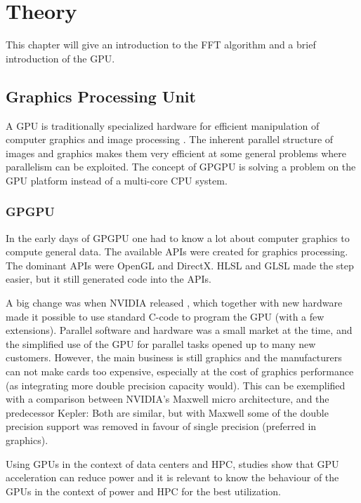 \chapter{Theory}

This chapter will give an introduction to the \gls{FFT} algorithm and a brief introduction of the \gls{GPU}.

\section{Graphics Processing Unit}

A GPU is traditionally specialized hardware for efficient manipulation of computer graphics and image processing \cite{owens2008gpu}. The inherent parallel structure of images and graphics makes them very efficient at some general problems where parallelism can be exploited. The concept of \gls{GPGPU} is solving a problem on the \gls{GPU} platform instead of a multi-core \gls{CPU} system.

\subsection{GPGPU}

In the early days of \gls{GPGPU} one had to know a lot about computer graphics to compute general data. The available APIs were created for graphics processing. The dominant \gls{API}s were OpenGL and DirectX. \gls{HLSL} and \gls{GLSL} made the step easier, but it still generated code into the \gls{API}s.

A big change was when NVIDIA released {\CU}, which together with new hardware made it possible to use standard C-code to program the \gls{GPU} (with a few extensions). Parallel software and hardware was a small market at the time, and the simplified use of the \gls{GPU} for parallel tasks opened up to many new customers. However, the main business is still graphics and the manufacturers can not make cards too expensive, especially at the cost of graphics performance (as integrating more double precision capacity would). This can be exemplified with a comparison between NVIDIA's Maxwell micro architecture, and the predecessor Kepler: Both are similar, but with Maxwell some of the double precision support was removed in favour of single precision (preferred in graphics).

Using GPUs in the context of data centers and \gls{HPC}, studies show that \gls{GPU} acceleration can reduce power \cite{huang2009energy} and it is relevant to know the behaviour of the GPUs in the context of power and \gls{HPC} \cite{ghosh2012energy} for the best utilization.

